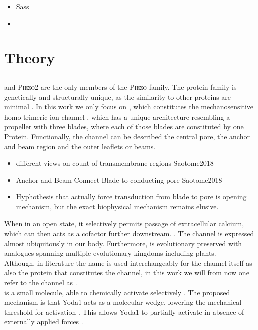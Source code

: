 \begin{itemize}
	\item Sass
	\item 
\end{itemize}


\section{Theory}

\subsection{\Piezo{}}


\Piezo{} and \textsc{Piezo2} are the only members of the \textsc{Piezo}-family. The protein family is genetically and structurally unique, as the similarity to other proteins are minimal \cite{Coste2010}. In this work we only focus on \Piezo{}, which constitutes the mechanosensitive homo-trimeric ion channel \Piezo{}, which has a unique architecture resembling a propeller with three blades, where each of those blades are constituted by one \Piezo{} Protein. Functionally, the channel can be described the central pore, the anchor and beam region and the outer leaflets or beams. 

\begin{itemize}
	\item different views on count of transmembrane regions Saotome2018
	\item Anchor and Beam Connect Blade to conducting pore Saotome2018
	\item Hyphothesis that actually force transduction from blade to pore is opening mechanism, but the exact biophysical mechanism remains elusive. 
\end{itemize}

 When in an open state, it selectively permits passage of extracellular calcium, which can then acts as a cofactor further downstream. \cite{Coste2010}. The channel is expressed almost ubiquitously in our body. Furthermore, \Piezo{} is evolutionary preserved with analogues spanning multiple evolutionary kingdoms including plants. \cite{Coste2010}\\
Although, in literature the name \Piezo{} is used interchangeably for the channel itself as also the protein that constitutes the channel, in this work we will from now one refer to the channel as \Piezo{}.\\
\Yoda{} is a small molecule, able to chemically activate \Piezo{} selectively \cite{Syeda2015}. The proposed mechanism is that Yoda1 acts as a molecular wedge, lowering the mechanical threshold for activation \cite{Botello-Smith2019}. This allows Yoda1 to partially activate \Piezo{} in absence of externally applied forces \cite{Lacroix2018}.

